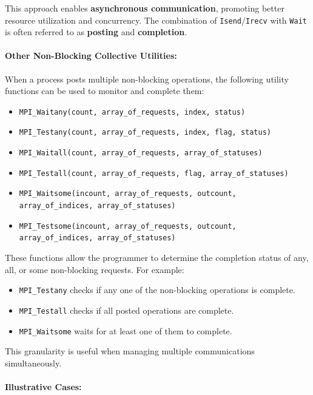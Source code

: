 \documentclass[12pt]{book}
\begin{document}
This approach enables \textbf{asynchronous communication}, promoting better resource utilization and concurrency. The combination of \texttt{Isend}/\texttt{Irecv} with \texttt{Wait} is often referred to as \textbf{posting} and \textbf{completion}.

\paragraph{Other Non-Blocking Collective Utilities:}

When a process posts multiple non-blocking operations, the following utility functions can be used to monitor and complete them:

\begin{itemize}
    \item \texttt{MPI\_Waitany(count, array\_of\_requests, index, status)}
    \item \texttt{MPI\_Testany(count, array\_of\_requests, index, flag, status)}
    \item \texttt{MPI\_Waitall(count, array\_of\_requests, array\_of\_statuses)}
    \item \texttt{MPI\_Testall(count, array\_of\_requests, flag, array\_of\_statuses)}
    \item \texttt{MPI\_Waitsome(incount, array\_of\_requests, outcount, array\_of\_indices, array\_of\_statuses)}
    \item \texttt{MPI\_Testsome(incount, array\_of\_requests, outcount, array\_of\_indices, array\_of\_statuses)}
\end{itemize}

These functions allow the programmer to determine the completion status of any, all, or some non-blocking requests. For example:
\begin{itemize}
    \item \texttt{MPI\_Testany} checks if any one of the non-blocking operations is complete.
    \item \texttt{MPI\_Testall} checks if all posted operations are complete.
    \item \texttt{MPI\_Waitsome} waits for at least one of them to complete.
\end{itemize}

This granularity is useful when managing multiple communications simultaneously.

\paragraph{Illustrative Cases:}
\end{document}
